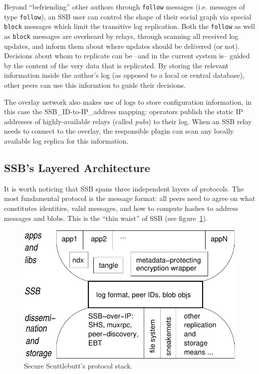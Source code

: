 \documentclass[9pt,sigconf]{acmart}
\begin{document}
Beyond ``befriending'' other authors through {\tt follow} messages (i.e. messages of type {\tt follow}), an SSB user can control the shape of their social graph via special {\tt block} messages which limit the transitive log replication. Both the {\tt follow} as well as {\tt block} messages are overheard by relays, through scanning all received log updates, and inform them about where updates should be delivered (or not). Decisions about whom to replicate can be --and in the current system is-- guided by the content of the very data that is replicated. By storing the relevant information inside the author's log (as opposed to a local or central database), other peers can use this informtion to guide their decisions.

The overlay network also makes use of logs to store configuration information, in this case the SSB\_ID-to-IP\_address mapping: operators publish the static IP addresses of highly-available relays (called {\em pubs}) to their log. When an SSB relay needs to connect to the overlay, the responsible plugin can scan any locally available log replica for this information.

\subsection*{SSB's Layered Architecture}

It is worth noticing that SSB spans three independent layers of protocols. The most fundamental protocol is the message format: all peers need to agree on what constitutes identities, valid messages, and how to compute hashes to address messages and blobs. This is the ``thin waist'' of SSB (see figure~\ref{fig:waist}).

\begin{figure}[htb]
  \includegraphics[width=0.9\columnwidth]{figs/ssb-waist.pdf}
  \caption{Secure Scuttlebutt's protocol stack.}
  \label{fig:waist}
\end{figure}
\end{document}
